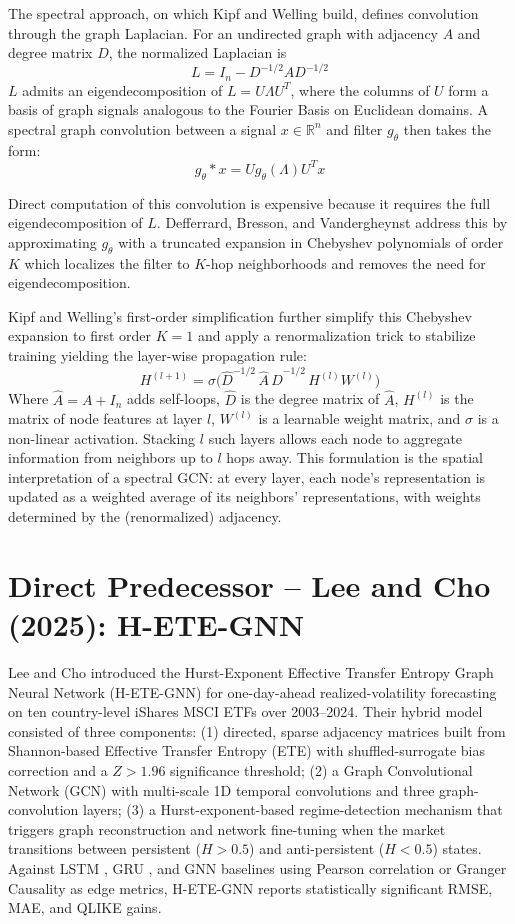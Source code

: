 \documentclass[12pt,oneside]{report}
\begin{document}
The spectral approach, on which Kipf and Welling \cite{kipf2017} build,
defines convolution through the graph Laplacian. For an undirected graph
with adjacency $A$ and degree matrix $D$, the normalized Laplacian is
\[
  L = I_{n} - D^{-1/2} A D^{-1/2}
\]
$L$ admits an eigendecomposition of $L = U \Lambda U^{T}$, where the
columns of $U$ form a basis of graph signals analogous to the Fourier
Basis on Euclidean domains. A spectral graph convolution between a
signal $x \in \mathbb{R}^{n}$ and filter $g_{\theta}$ then takes the
form:
\[
  g_{\theta} * x = U g_{\theta}(\Lambda) U^{T} x
\]

Direct computation of this convolution is expensive because it requires
the full eigendecomposition of $L$. Defferrard, Bresson, and
Vandergheynst \cite{defferrard2016} address this by approximating
$g_{\theta}$ with a truncated expansion in Chebyshev polynomials of
order $K$ which localizes the filter to $K$-hop neighborhoods and
removes the need for eigendecomposition.

Kipf and Welling's first-order simplification \cite{kipf2017} further
simplify this Chebyshev expansion to first order $K = 1$ and apply a
renormalization trick to stabilize training yielding the layer-wise
propagation rule:
\[
  H^{(l+1)} = \sigma\bigl(\widehat{D}^{-1/2}\,\widehat{A}\,\widehat{D}^{-1/2}\,H^{(l)} W^{(l)}\bigr)
\]
Where $\widehat{A} = A + I_{n}$ adds self-loops, $\widehat{D}$ is the
degree matrix of $\widehat{A}$, $H^{(l)}$ is the matrix of node features
at layer $l$, $W^{(l)}$ is a learnable weight matrix, and $\sigma$ is a
non-linear activation. Stacking $l$ such layers allows each node to
aggregate information from neighbors up to $l$ hops away. This
formulation is the spatial interpretation of a spectral GCN: at every
layer, each node's representation is updated as a weighted average of
its neighbors' representations, with weights determined by the
(renormalized) adjacency.

\section{Direct Predecessor -- Lee and Cho (2025): H-ETE-GNN}

Lee and Cho \cite{lee2025} introduced the Hurst-Exponent Effective
Transfer Entropy Graph Neural Network (H-ETE-GNN) for one-day-ahead
realized-volatility forecasting on ten country-level iShares MSCI ETFs
over 2003--2024. Their hybrid model consisted of three components: (1)
directed, sparse adjacency matrices built from Shannon-based Effective
Transfer Entropy (ETE) with shuffled-surrogate bias correction and a
$Z > 1.96$ significance threshold; (2) a Graph Convolutional Network
(GCN) with multi-scale 1D temporal convolutions and three
graph-convolution layers; (3) a Hurst-exponent-based regime-detection
mechanism that triggers graph reconstruction and network fine-tuning
when the market transitions between persistent ($H > 0.5$) and
anti-persistent ($H < 0.5$) states. Against LSTM \cite{hochreiter1997},
GRU \cite{cho2014}, and GNN baselines using Pearson correlation or
Granger Causality \cite{granger1969} as edge metrics, H-ETE-GNN reports
statistically significant RMSE, MAE, and QLIKE gains.
\end{document}
